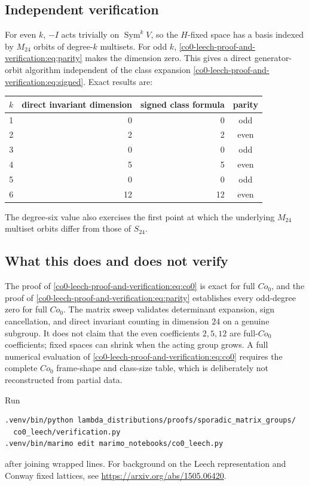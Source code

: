 \documentclass[10pt]{article}
\begin{document}
\subsection{Independent verification}
For even $k$, $-I$ acts trivially on $\operatorname{Sym}^kV$, so the $H$-fixed
space has a basis indexed by $M_{24}$ orbits of degree-$k$ multisets.  For odd
$k$, \eqref{co0-leech-proof-and-verification:eq:parity} makes the dimension zero.  This gives a direct
generator-orbit algorithm independent of the class expansion
\eqref{co0-leech-proof-and-verification:eq:signed}.  Exact results are:
\begin{center}
\begin{tabular}{@{}crrc@{}}\toprule
$k$ & direct invariant dimension & signed class formula & parity\\\midrule
1&0&0&odd\\
2&2&2&even\\
3&0&0&odd\\
4&5&5&even\\
5&0&0&odd\\
6&12&12&even\\\bottomrule
\end{tabular}
\end{center}
The degree-six value also exercises the first point at which the underlying
$M_{24}$ multiset orbits differ from those of $S_{24}$.

\subsection{What this does and does not verify}
The proof of \eqref{co0-leech-proof-and-verification:eq:co0} is exact for full $Co_0$, and the proof of
\eqref{co0-leech-proof-and-verification:eq:parity} establishes every odd-degree zero for full $Co_0$.  The
matrix sweep validates determinant expansion, sign cancellation, and direct
invariant counting in dimension $24$ on a genuine subgroup.  It does not
claim that the even coefficients $2,5,12$ are full-$Co_0$ coefficients; fixed
spaces can shrink when the acting group grows.  A full numerical evaluation
of \eqref{co0-leech-proof-and-verification:eq:co0} requires the complete $Co_0$ frame-shape and class-size
table, which is deliberately not reconstructed from partial data.

Run
\begin{verbatim}
.venv/bin/python lambda_distributions/proofs/sporadic_matrix_groups/
  co0_leech/verification.py
.venv/bin/marimo edit marimo_notebooks/co0_leech.py
\end{verbatim}
after joining wrapped lines.  For background on the Leech representation and
Conway fixed lattices, see \url{https://arxiv.org/abs/1505.06420}.
\endgroup
\end{document}
